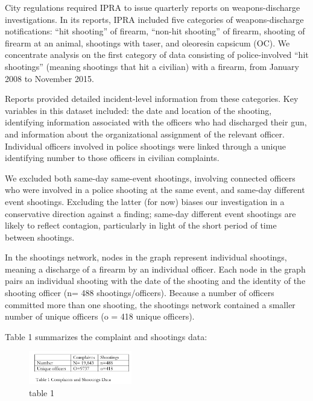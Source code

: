 City regulations required IPRA to issue quarterly reports on weapons-discharge
investigations. In its reports, IPRA included five categories of
weapons-discharge notifications: “hit shooting” of firearm, “non-hit shooting”
of firearm, shooting of firearm at an animal, shootings with taser, and
oleoresin capsicum (OC). We concentrate analysis on the first category of data
consisting of police-involved “hit shootings” (meaning shootings that hit a
civilian) with a firearm, from January 2008 to November 2015. 

Reports provided detailed incident-level information from these categories. Key
variables in this dataset included: the date and location of the shooting,
identifying information associated with the officers who had discharged their
gun, and information about the organizational assignment of the relevant
officer. Individual officers involved in police shootings were linked through a
unique identifying number to those officers in civilian complaints.

We excluded both same-day same-event shootings, involving connected officers
who were involved in a police shooting at the same event, and same-day
different event shootings. Excluding the latter (for now) biases our
investigation in a conservative direction against a finding; same-day different
event shootings are likely to reflect contagion, particularly in light of the
short period of time between shootings.

In the shootings network, nodes in the graph represent individual shootings,
meaning a discharge of a firearm by an individual officer. Each node in the
graph pairs an individual shooting with the date of the shooting and the
identity of the shooting officer (n= 488 shootings/officers). Because a number
of officers committed more than one shooting, the shootings network contained a
smaller number of unique officers (o = 418 unique officers).

Table 1 summarizes the complaint and shootings data:

\begin{figure}
\includegraphics[width=0.4\textwidth]{figs/complaints_shootings_table_0.png}
\caption{table 1}
\end{figure}


